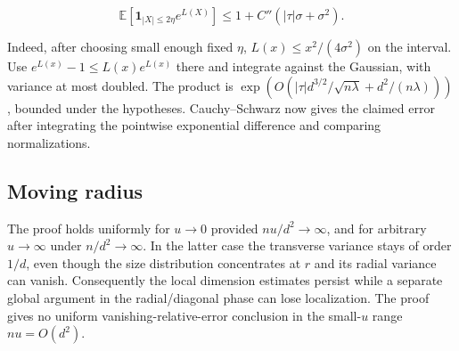 \begin{equation*}
\mathbb E[\mathbf 1_{|X|\le2\eta}e^{L(X)}]
\le 1+C''(|\tau|\sigma+\sigma^2).
\end{equation*}

Indeed, after choosing small enough fixed $\eta$, $L(x)\le x^2/(4\sigma^2)$ on the interval. Use $e^{L(x)}-1\le L(x)e^{L(x)}$ there and integrate against the Gaussian, with variance at most doubled. The product is $\exp(O(|\tau|d^{3/2}/\sqrt{n\lambda}+d^2/(n\lambda)))$, bounded under the hypotheses. Cauchy--Schwarz now gives the claimed error after integrating the pointwise exponential difference and comparing normalizations.

\subsection{Moving radius}

The proof holds uniformly for $u\to0$ provided $nu/d^2\to\infty$, and for arbitrary $u\to\infty$ under $n/d^2\to\infty$. In the latter case the transverse variance stays of order $1/d$, even though the size distribution concentrates at $r$ and its radial variance can vanish. Consequently the local dimension estimates persist while a separate global argument in the radial/diagonal phase can lose localization. The proof gives no uniform vanishing-relative-error conclusion in the small-$u$ range $nu=O(d^2)$.
